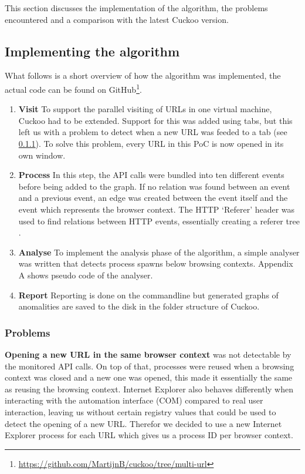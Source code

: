 This section discusses the implementation of the algorithm, the problems encountered and a comparison with the latest Cuckoo version.

\subsection{Implementing the algorithm}

What follows is a short overview of how the algorithm was implemented, the actual code can be found on GitHub\footnote{\url{https://github.com/MartijnB/cuckoo/tree/multi-url}}.

\begin{enumerate}
\item \textbf{Visit} To support the parallel visiting of URLs in one virtual machine, Cuckoo had to be extended. Support for this was added using tabs, but this left us with a problem to detect when a new URL was feeded to a tab (see \ref{99problems}). To solve this problem, every URL in this PoC is now opened in its own window.

\item \textbf{Process} In this step, the API calls were bundled into ten different events before being added to the graph. If no relation was found between an event and a previous event, an edge was created between the event itself and the event which represents the browser context. The HTTP `Referer' header was used to find relations between HTTP events, essentially creating a referer tree \cite{qui}. 

\item \textbf{Analyse} To implement the analysis phase of the algorithm, a simple analyser was written that detects process spawns below browsing contexts. Appendix A shows pseudo code of the analyser.

\item \textbf{Report} Reporting is done on the commandline but generated graphs of anomalities are saved to the disk in the folder structure of Cuckoo.
\end{enumerate}

\subsubsection{Problems}
\label{99problems}

\textbf{Opening a new URL in the same browser context} was not detectable by the monitored API calls. On top of that, processes were reused when a browsing context was closed and a new one was opened, this made it essentially the same as reusing the browsing context. Internet Explorer also behaves differently when interacting with the automation interface (COM) compared to real user interaction, leaving us without certain registry values that could be used to detect the opening of a new URL. Therefor we decided to use a new Internet Explorer process for each URL which gives us a process ID per browser context.

